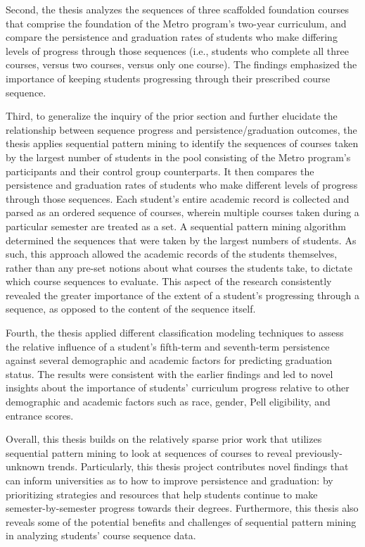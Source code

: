 Second, the thesis analyzes the sequences of three scaffolded foundation courses that comprise the foundation of the Metro program's two-year curriculum, and compare the persistence and graduation rates of students who make differing levels of progress through those sequences (i.e., students who complete all three courses, versus two courses, versus only one course).  The findings emphasized the importance of keeping students progressing through their prescribed course sequence.

Third, to generalize the inquiry of the prior section and further elucidate the relationship between sequence progress and persistence/graduation outcomes, the thesis applies sequential pattern mining to identify the sequences of courses taken by the largest number of students in the pool consisting of the Metro program's participants and their control group counterparts.  It then compares the persistence and graduation rates of students who make different levels of progress through those sequences.   Each student's entire academic record is collected and parsed as an ordered sequence of courses, wherein multiple courses taken during a particular semester are treated as a set.  A sequential pattern mining algorithm determined the sequences that were taken by the largest numbers of students.  As such, this approach allowed the academic records of the students themselves, rather than any pre-set notions about what courses the students take, to dictate which course sequences to evaluate.  This aspect of the research consistently revealed the greater importance of the extent of a student's progressing through a sequence, as opposed to the content of the sequence itself.  

Fourth, the thesis applied different classification modeling techniques to assess the relative influence of a student's fifth-term and seventh-term persistence against several demographic and academic factors for predicting graduation status.  The results were consistent with the earlier findings and led to novel insights about the importance of students' curriculum progress relative to other demographic and academic factors such as race, gender, Pell eligibility, and entrance scores.

Overall, this thesis builds on the relatively sparse prior work that utilizes sequential pattern mining to look at sequences of courses to reveal previously-unknown trends.  Particularly, this thesis project contributes novel findings that can inform universities as to how to improve persistence and graduation: by prioritizing strategies and resources that help students continue to make semester-by-semester progress towards their degrees.  Furthermore, this thesis also reveals some of the potential benefits and challenges of sequential pattern mining in analyzing students' course sequence data.

